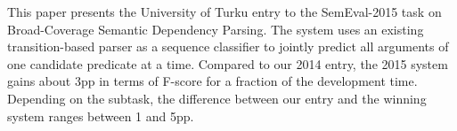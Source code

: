 This paper presents the University of Turku entry to the SemEval-2015 task on Broad-Coverage Semantic Dependency Parsing. The system uses an existing transition-based parser as a sequence classifier to jointly predict all arguments of one candidate predicate at a time. Compared to our 2014 entry, the 2015 system gains about 3pp in terms of F-score for a fraction of the development time. Depending on the subtask, the difference between our entry and the winning system ranges between 1 and 5pp.
